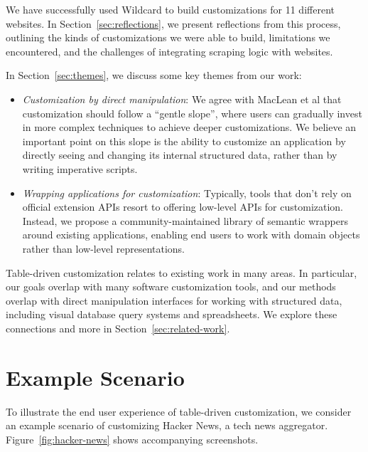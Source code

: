 \documentclass[sigplan,screen,10pt,anonymous,review]{acmart}
\providecommand{\tightlist}{%
  \setlength{\itemsep}{0pt}\setlength{\parskip}{0pt}}
\begin{document}
We have successfully used Wildcard to build customizations for 11
different websites. In Section~\ref{sec:reflections}, we present
reflections from this process, outlining the kinds of customizations we
were able to build, limitations we encountered, and the challenges of
integrating scraping logic with websites.

In Section~\ref{sec:themes}, we discuss some key themes from our work:

\begin{itemize}
\tightlist
\item
  \emph{Customization by direct manipulation}: We agree with MacLean et
  al \citep{maclean1990} that customization should follow a ``gentle
  slope'', where users can gradually invest in more complex techniques
  to achieve deeper customizations. We believe an important point on
  this slope is the ability to customize an application by directly
  seeing and changing its internal structured data, rather than by
  writing imperative scripts.
\item
  \emph{Wrapping applications for customization}: Typically, tools that
  don't rely on official extension APIs resort to offering low-level
  APIs for customization. Instead, we propose a community-maintained
  library of semantic wrappers around existing applications, enabling
  end users to work with domain objects rather than low-level
  representations.
\end{itemize}

Table-driven customization relates to existing work in many areas. In
particular, our goals overlap with many software customization tools,
and our methods overlap with direct manipulation interfaces for working
with structured data, including visual database query systems and
spreadsheets. We explore these connections and more in
Section~\ref{sec:related-work}.

\hypertarget{sec:example}{%
\section{Example Scenario}\label{sec:example}}

To illustrate the end user experience of table-driven customization, we
consider an example scenario of customizing Hacker News, a tech news
aggregator. Figure~\ref{fig:hacker-news} shows accompanying screenshots.
\end{document}
